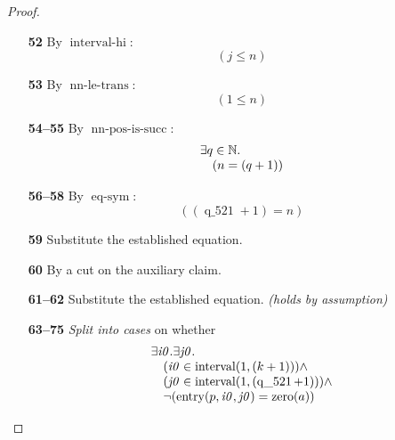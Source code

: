 \documentclass[11pt]{article}
\theoremstyle{plain}
\begin{document}
\begin{proof}
\begin{itemize}[leftmargin=2.8em, itemsep=4pt, parsep=1pt]
  \item[\textbf{52}] By $\operatorname{interval\text{-}hi}$:
\begin{equation*}
(j \leq n)
\end{equation*}

  \item[\textbf{53}] By $\operatorname{nn\text{-}le\text{-}trans}$:
\begin{equation*}
(1 \leq n)
\end{equation*}

  \item[\textbf{54--55}] By $\operatorname{nn\text{-}pos\text{-}is\text{-}succ}$:
\begin{equation*}
\begin{array}{@{}l@{}} \exists q \in \mathbb{N}. \\ \quad (n = (q + 1)) \end{array}
\end{equation*}

  \item[\textbf{56--58}] By $\operatorname{eq\text{-}sym}$:
\begin{equation*}
((\operatorname{q\_521} + 1) = n)
\end{equation*}

  \item[\textbf{59}] Substitute the established equation.
  \item[\textbf{60}] By a cut on the auxiliary claim.
  \item[\textbf{61--62}] Substitute the established equation.  \emph{(holds by assumption)}
  \item[\textbf{63--75}] \emph{Split into cases} on whether
\begin{equation*}
\begin{array}{@{}l@{}} \exists \mathit{i0}. \exists \mathit{j0}. \\ \quad (\mathit{i0} \in \operatorname{interval}(1, (k + 1))) \wedge \\ \quad (\mathit{j0} \in \operatorname{interval}(1, (\operatorname{q\_521} + 1))) \wedge \\ \quad \neg (\operatorname{entry}(p, \mathit{i0}, \mathit{j0}) = \operatorname{zero}(a)) \end{array}
\end{equation*}


\end{itemize}
\end{proof}
\end{document}
